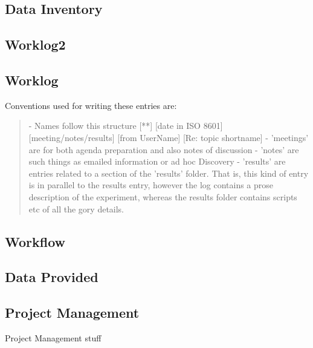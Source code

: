 \documentclass{article}
\begin{document}
\subsection*{Data Inventory}\label{datinv}
\subsection*{Worklog2}\label{mac2}
\subsection*{Worklog}\label{mac3}

Conventions used for writing these entries are:
\begin{quote}
- Names follow this structure [**] [date in ISO 8601] [meeting/notes/results] [from UserName] [Re: topic shortname]
- 'meetings' are for both agenda preparation and also notes of discussion
- 'notes' are such things as emailed information or ad hoc Discovery
- 'results' are entries related to a section of the 'results' folder. 
  That is, this kind of entry is in parallel to the results entry,
  however the log contains a prose description of the experiment,
  whereas the results folder contains scripts etc of all the gory
  details.  
\end{quote}
\subsection*{Workflow}\label{workflow}

\subsection*{Data Provided}\label{dataprov}
\clearpage
\subsection*{Project Management}\label{proj}
\hypertarget{proj}{Project Management stuff}
\end{document}
